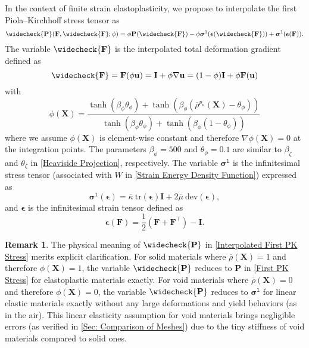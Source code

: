 \documentclass[preprint,11pt]{elsarticle}
\theoremstyle{definition}
\newtheorem{remark}{Remark}
\begin{document}
In the context of finite strain elastoplasticity, we propose to interpolate the first Piola--Kirchhoff stress tensor as
\begin{equation} \label{Interpolated First PK Stress}
    \widecheck{\mathbf{P}}(\mathbf{F}, \widecheck{\mathbf{F}}; \phi)
    = \phi \mathbf{P}(\widecheck{\mathbf{F}}) - \phi \boldsymbol{\sigma}^\texttt{l}(\boldsymbol{\epsilon}(\widecheck{\mathbf{F}})) + \boldsymbol{\sigma}^\texttt{l}(\boldsymbol{\epsilon}(\mathbf{F})).
\end{equation}
The variable $\widecheck{\mathbf{F}}$ is the interpolated total deformation gradient defined as
\begin{equation*}
    \widecheck{\mathbf{F}} = \mathbf{F} (\phi \mathbf{u}) = \mathbf{I} + \phi \nabla \mathbf{u} = (1-\phi) \mathbf{I} + \phi \mathbf{F}(\mathbf{u})
\end{equation*}
with
\begin{equation*}
    \phi(\mathbf{X}) = \dfrac{\tanh(\beta_\phi \theta_\phi) + \tanh(\beta_\phi (\overline{\rho}^{p_\kappa} (\mathbf{X}) - \theta_\phi))}{\tanh(\beta_\phi \theta_\phi) + \tanh(\beta_\phi (1 - \theta_\phi))}
\end{equation*}
where we assume $\phi(\mathbf{X})$ is element-wise constant and therefore $\nabla \phi(\mathbf{X}) = 0$ at the integration points. The parameters $\beta_\phi = 500$ and $\theta_\phi = 0.1$ are similar to $\beta_\zeta$ and $\theta_\zeta$ in \eqref{Heaviside Projection}, respectively. The variable $\boldsymbol{\sigma}^\texttt{l}$ is the infinitesimal stress tensor (associated with $W$ in \eqref{Strain Energy Density Function}) expressed as
\begin{equation*}
    \boldsymbol{\sigma}^\texttt{l}(\boldsymbol{\epsilon}) = \overline{\kappa}\ \text{tr}(\boldsymbol{\epsilon}) \mathbf{I} + 2 \overline{\mu}\ \text{dev}(\boldsymbol{\epsilon}),
\end{equation*}
and $\boldsymbol{\epsilon}$ is the infinitesimal strain tensor defined as
\begin{equation*}
    \boldsymbol{\epsilon}(\mathbf{F}) = \dfrac{1}{2} \left( \mathbf{F} + \mathbf{F}^\top \right) - \mathbf{I}.
\end{equation*}

\begin{remark}
The physical meaning of $\widecheck{\mathbf{P}}$ in \eqref{Interpolated First PK Stress} merits explicit clarification. For solid materials where $\overline{\rho}(\mathbf{X}) = 1$ and therefore $\phi(\mathbf{X}) = 1$, the variable $\widecheck{\mathbf{P}}$ reduces to $\mathbf{P}$ in \eqref{First PK Stress} for elastoplastic materials exactly. For void materials where $\overline{\rho}(\mathbf{X}) = 0$ and therefore $\phi(\mathbf{X}) = 0$, the variable $\widecheck{\mathbf{P}}$ reduces to $\boldsymbol{\sigma}^\texttt{l}$ for linear elastic materials exactly without any large deformations and yield behaviors (as in the air). This linear elasticity assumption for void materials brings negligible errors (as verified in \ref{Sec: Comparison of Meshes}) due to the tiny stiffness of void materials compared to solid ones.
\end{remark}
\end{document}
